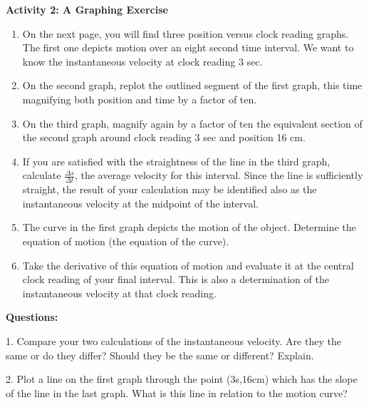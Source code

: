 {\noindent \bf Activity 2: A Graphing Exercise} \begin{enumerate}

\item On the next page, you will find three position versus clock reading graphs. The first one depicts motion over an eight second time interval. We want to know the instantaneous velocity at clock reading 3 sec.

\item On the second graph, replot the outlined segment of the first graph, this time magnifying both position and time by a factor of ten.

\item On the third graph, magnify again by a factor of ten the equivalent section of the second graph around clock reading 3 sec and position 16 cm. 

\item If you are satisfied with the straightness of the line in the third graph, calculate $\frac{\Delta s}{\Delta t}$, the average velocity for this interval. Since the line is sufficiently straight, the result of your calculation may be identified also as the instantaneous velocity at the midpoint of the interval.

\item The curve in the first graph depicts the motion of the object. Determine the equation of motion (the equation of the curve).

\item Take the derivative of this equation of motion and evaluate it at the central clock reading of your final interval. This is also a determination of the instantaneous velocity at that clock reading.

\end{enumerate}

\medskip

{\noindent \bf Questions:}

1. Compare your two calculations of the instantaneous velocity. Are they the
same or do they differ? Should they be the same or different? Explain. 
\vspace{20mm}

2. Plot a line on the first graph through the point (3s,16cm) which has the
slope of the line in the last graph. What is this line in relation to the motion
curve?

